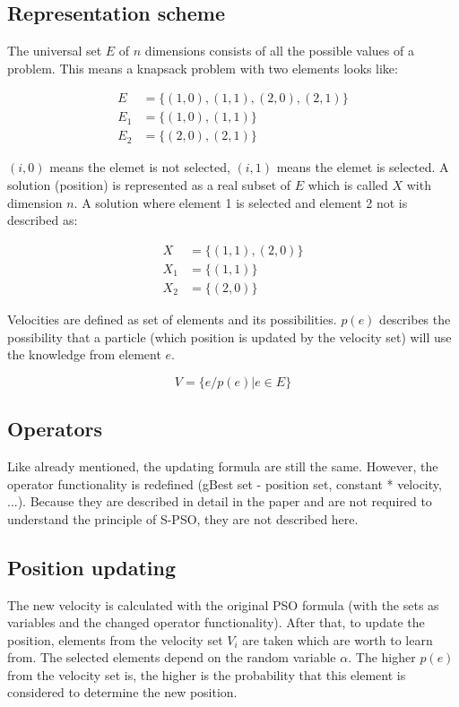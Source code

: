 \documentclass{article}
\begin{document}
\subsection{Representation scheme}
The universal set $E$ of $n$ dimensions consists of all the possible values of a problem. This means a knapsack problem with two elements looks like:

\begin{equation}
\begin{aligned}
E &= \{(1,0),(1,1),(2,0),(2,1)\}\\
E_1 &= \{(1,0),(1,1)\}\\
E_2 &= \{(2,0),(2,1)\}
\end{aligned}
\end{equation}

$(i,0)$ means the elemet is not selected, $(i,1)$ means the elemet is selected. A solution (position) is represented as a real subset of $E$ which is called $X$ with dimension $n$. A solution where element 1 is selected and element 2 not is described as:

\begin{equation}
\begin{aligned}
X &= \{(1,1),(2,0)\}\\
X_1 &= \{(1,1)\}\\
X_2 &= \{(2,0)\}
\end{aligned}
\end{equation}

Velocities are defined as set of elements and its possibilities. $p(e)$ describes the possibility that a particle (which position is updated by the velocity set) will use the knowledge from element $e$.

\begin{equation}
V = \{e/p(e)| e \in E\}
\end{equation}

\subsection{Operators}
Like already mentioned, the updating formula are still the same. However, the operator functionality is redefined (gBest set - position set, constant * velocity, ...). Because they are described in detail in the paper and are not required to understand the principle of S-PSO, they are not described here.

\subsection{Position updating}
The new velocity is calculated with the original PSO formula (with the sets as variables and the changed operator functionality). After that, to update the position, elements from the velocity set $V_i$ are taken which are worth to learn from. The selected elements depend on the random variable $\alpha$. The higher $p(e)$ from the velocity set is, the higher is the probability that this element is considered to determine the new position.
\end{document}
